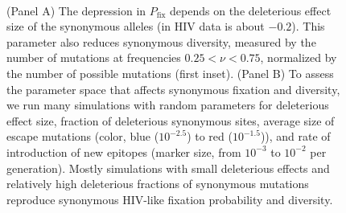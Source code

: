 \documentclass[rmp, twocolumn]{revtex4}
\begin{document}
\begin{figure}
\begin{center}
\\
\caption{(Panel A) The depression in $P_\text{fix}$ depends on the deleterious
effect size of the synonymous alleles (in HIV data is about $-0.2$).
This parameter also reduces synonymous
diversity, measured by the number of mutations at frequencies $0.25 < \nu < 0.75$,
normalized by the number of possible mutations (first inset).
(Panel B) To assess the parameter space that affects synonymous fixation and
diversity, we run many simulations with random parameters for deleterious effect
size, fraction of deleterious synonymous sites, average size of escape
mutations (color, blue ($10^{-2.5}$) to red ($10^{-1.5}$)), and rate of
introduction of new epitopes (marker size, from $10^{-3}$ to $10^{-2}$ per
generation). Mostly simulations with small deleterious effects and relatively
high deleterious fractions of synonymous mutations reproduce synonymous HIV-like
fixation probability and diversity.}
\label{fig:simheat}
\end{center}
\end{figure}
\end{document}
